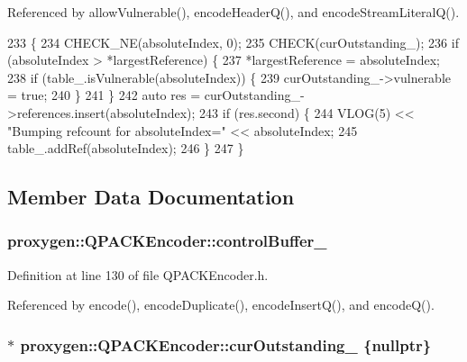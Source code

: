 Referenced by allow\+Vulnerable(), encode\+Header\+Q(), and encode\+Stream\+Literal\+Q().


\begin{DoxyCode}
233                                                               \{
234   CHECK\_NE(absoluteIndex, 0);
235   CHECK(curOutstanding_);
236   \textcolor{keywordflow}{if} (absoluteIndex > *largestReference) \{
237     *largestReference = absoluteIndex;
238     \textcolor{keywordflow}{if} (table_.isVulnerable(absoluteIndex)) \{
239       curOutstanding_->vulnerable = \textcolor{keyword}{true};
240     \}
241   \}
242   \textcolor{keyword}{auto} res = curOutstanding_->references.insert(absoluteIndex);
243   \textcolor{keywordflow}{if} (res.second) \{
244     VLOG(5) << \textcolor{stringliteral}{"Bumping refcount for absoluteIndex="} << absoluteIndex;
245     table_.addRef(absoluteIndex);
246   \}
247 \}
\end{DoxyCode}


\subsection{Member Data Documentation}
\subsubsection[{control\+Buffer\+\_\+}]{ proxygen\+::\+Q\+P\+A\+C\+K\+Encoder\+::control\+Buffer\+\_\+\hspace{0.3cm}{\ttfamily [private]}}\label{classproxygen_1_1QPACKEncoder_a17bc89bbd4b75ecf2dcb2a308f6f8b41}


Definition at line 130 of file Q\+P\+A\+C\+K\+Encoder.\+h.



Referenced by encode(), encode\+Duplicate(), encode\+Insert\+Q(), and encode\+Q().

\subsubsection[{cur\+Outstanding\+\_\+}]{$\ast$ proxygen\+::\+Q\+P\+A\+C\+K\+Encoder\+::cur\+Outstanding\+\_\+ \{{\bf nullptr}\}\hspace{0.3cm}{\ttfamily [private]}}\label{classproxygen_1_1QPACKEncoder_ae28c16a6d2fa808b340dffcb3fcf3cf0}


